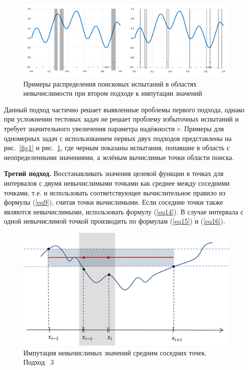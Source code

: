 \documentclass[10pt,a4paper]{book}
\begin{document}
\begin{figure}
\includegraphics[width=\textwidth]{pic/fig2.png}
\caption{Примеры распределения поисковых испытаний в областях невычислимости при втором подходе к импутации значений} \label{fig2}
\end{figure}

Данный подход частично решает выявленные проблемы первого подхода, однако при усложнении тестовых задач не решает проблему избыточных испытаний и требует значительного увеличения параметра надёжности $r$. Примеры для одномерных задач с использованием первых двух подходов представлены на рис.~\ref{fig1} и рис.~\ref{fig2}, где черным показаны испытания, попавшие в область с неопределенными значениями, а зелёным вычислимые точки области поиска.

\textbf{Третий подход.} Восстанавливать значения целевой функции в точках для интервалов с двумя невычислимыми точками как среднее между соседними точками, т.е. и использовать соответствующее вычислительное правило из формулы (\ref{eq9}), считая точки вычислимыми. Если соседние точки также являются невычислимыми, использовать формулу (\ref{eq14}). В случае интервала с одной невычислимой точкой производить по формулам (\ref{eq15}) и (\ref{eq16}).

\begin{figure}
\centering
\includegraphics[width=\textwidth]{pic/fig3.png}
\caption{Импутация невычислимых значений средним соседних точек. Подход \No~3} \label{fig3}
\end{figure}
\end{document}
